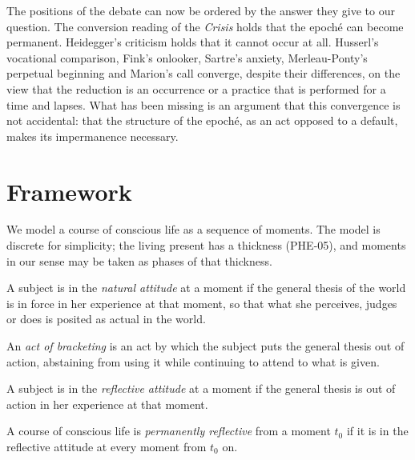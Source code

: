 \documentclass{situationist-preprint}
\begin{document}
The positions of the debate can now be ordered by the answer they give to our question. The conversion reading of the \emph{Crisis} holds that the epoché can become permanent. Heidegger's criticism holds that it cannot occur at all. Husserl's vocational comparison, Fink's onlooker, Sartre's anxiety, Merleau-Ponty's perpetual beginning and Marion's call converge, despite their differences, on the view that the reduction is an occurrence or a practice that is performed for a time and lapses. What has been missing is an argument that this convergence is not accidental: that the structure of the epoché, as an act opposed to a default, makes its impermanence necessary.

\section{Framework}\label{s:framework}

We model a course of conscious life as a sequence of moments. The model is discrete for simplicity; the living present has a thickness (PHE-05), and moments in our sense may be taken as phases of that thickness.

\begin{definition}\label{d:natural}
A subject is in the \emph{natural attitude} at a moment if the general thesis of the world is in force in her experience at that moment, so that what she perceives, judges or does is posited as actual in the world.
\end{definition}

\begin{definition}\label{d:bracket}
An \emph{act of bracketing} is an act by which the subject puts the general thesis out of action, abstaining from using it while continuing to attend to what is given.
\end{definition}

\begin{definition}\label{d:reflective}
A subject is in the \emph{reflective attitude} at a moment if the general thesis is out of action in her experience at that moment.
\end{definition}

\begin{definition}[Permanence]\label{d:permanent}
A course of conscious life is \emph{permanently reflective} from a moment $t_0$ if it is in the reflective attitude at every moment from $t_0$ on.
\end{definition}
\end{document}
